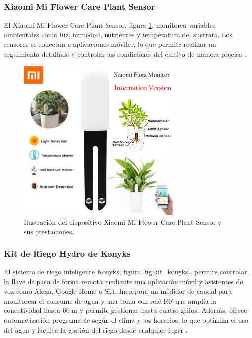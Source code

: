 \subsubsection{Xiaomi Mi Flower Care Plant Sensor}
El Xiaomi Mi Flower Care Plant Sensor, figura \ref{fig:xiaomi}, monitorea variables ambientales como luz, humedad, nutrientes y temperatura del sustrato. Los sensores se conectan a aplicaciones móviles, lo que permite realizar un seguimiento detallado y controlar las condiciones del cultivo de manera precisa \cite{XIAOMI}.

\begin{figure}[h]
	\centering
	\includegraphics[height=8cm]{./Figures/xiaomi.jpg}
	\caption{Ilustración del dispositivo Xiaomi Mi Flower Care Plant Sensor y sus prestaciones\protect\footnotemark.}
	\label{fig:xiaomi}
\end{figure}





\subsubsection{Kit de Riego Hydro de Konyks}
El sistema de riego inteligente Konyks, figura \ref{fig:kit_konyks}, permite controlar la llave de paso de forma remota mediante una aplicación móvil y asistentes de voz como Alexa, Google Home o Siri. Incorpora un medidor de caudal para monitorear el consumo de agua y una toma con relé RF que amplía la conectividad hasta 60 m y permite gestionar hasta cuatro grifos. Además, ofrece automatización programable según el clima y los horarios, lo que optimiza el uso del agua y facilita la gestión del riego desde cualquier lugar \cite{KONIX}.

